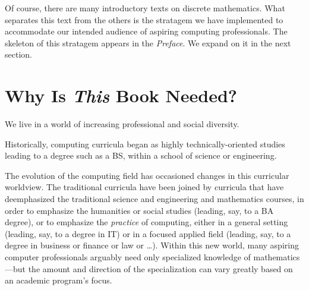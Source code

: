 \bigskip

Of course, there are many introductory texts on discrete mathematics.
What separates this text from the others is the stratagem we have
implemented to accommodate our intended audience of aspiring computing
professionals.  The skeleton of this stratagem appears in the {\it
  Preface}.  We expand on it in the next section.



\section{Why Is {\em This} Book Needed?}
\label{sec:thisbookneed}

We live in a world of increasing professional and social diversity.

\medskip

Historically, computing curricula began as highly technically-oriented
studies leading to a degree such as a BS, within a school of science
or engineering.
\bigskip

\noindent {}
\bigskip

\noindent
The evolution of the computing field has occasioned changes in this
curricular worldview.  The traditional curricula have been joined by
curricula that have deemphasized the traditional science and
engineering and mathematics courses, in order to emphasize the
humanities or social studies (leading, say, to a BA degree), or to
emphasize the {\em practice} of computing, either in a general setting
(leading, say, to a degree in IT) or in a focused applied field
(leading, say, to a degree in business or finance or law or \ldots).
Within this new world, many aspiring computer professionals arguably
need only specialized knowledge of mathematics---but the amount and
direction of the specialization can vary greatly based on an academic
program's focus.

